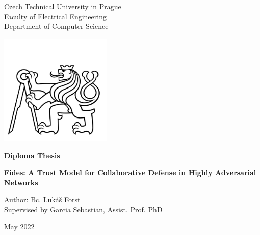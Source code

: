 

\begin{titlepage}
    \begin{center}
        
        \LARGE
        Czech Technical University in Prague\\
        Faculty of Electrical Engineering\\
        Department of Computer Science
        
        \includegraphics[width=0.4\textwidth]{assets/ctu_blackwhite.jpg}

        \Large
        \textbf{Diploma Thesis}
        
        \vfill
        
        \vspace*{0.5cm}
        \LARGE
        \textbf{Fides: A Trust Model for Collaborative Defense in Highly Adversarial Networks}
        
        \vfill

        \large
        Author: Bc. Lukáš Forst \\
        Supervised by Garcia Sebastian, Assist. Prof. PhD
        
        \vspace{0.8cm}

        \Large
        May 2022

    \end{center}
\end{titlepage}

\thispagestyle{empty}
\cleardoublepage